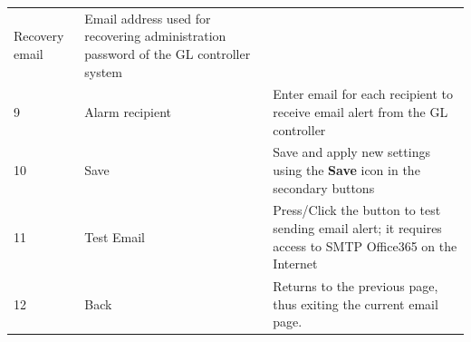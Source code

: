\begin{longtable}[]{@{}lll@{}}
\begin{minipage}[t]{0.23\columnwidth}
Recovery email\strut
\end{minipage} & \begin{minipage}[t]{0.65\columnwidth}\raggedright
Email address used for recovering administration password of the GL
controller system\strut
\end{minipage}\tabularnewline
\begin{minipage}[t]{0.04\columnwidth}\raggedright
9\strut
\end{minipage} & \begin{minipage}[t]{0.23\columnwidth}\raggedright
Alarm recipient\strut
\end{minipage} & \begin{minipage}[t]{0.65\columnwidth}\raggedright
Enter email for each recipient to receive email alert from the GL
controller\strut
\end{minipage}\tabularnewline
\begin{minipage}[t]{0.04\columnwidth}\raggedright
10\strut
\end{minipage} & \begin{minipage}[t]{0.23\columnwidth}\raggedright
Save\strut
\end{minipage} & \begin{minipage}[t]{0.65\columnwidth}\raggedright
Save and apply new settings using the \textbf{Save} icon in the
secondary buttons\strut
\end{minipage}\tabularnewline
\begin{minipage}[t]{0.04\columnwidth}\raggedright
11\strut
\end{minipage} & \begin{minipage}[t]{0.23\columnwidth}\raggedright
Test Email\strut
\end{minipage} & \begin{minipage}[t]{0.65\columnwidth}\raggedright
Press/Click the button to test sending email alert; it requires access
to SMTP Office365 on the Internet\strut
\end{minipage}\tabularnewline
\begin{minipage}[t]{0.04\columnwidth}\raggedright
12\strut
\end{minipage} & \begin{minipage}[t]{0.23\columnwidth}\raggedright
Back\strut
\end{minipage} & \begin{minipage}[t]{0.65\columnwidth}\raggedright
Returns to the previous page, thus exiting the current email page.\strut
\end{minipage}\tabularnewline
\bottomrule
\end{longtable}


